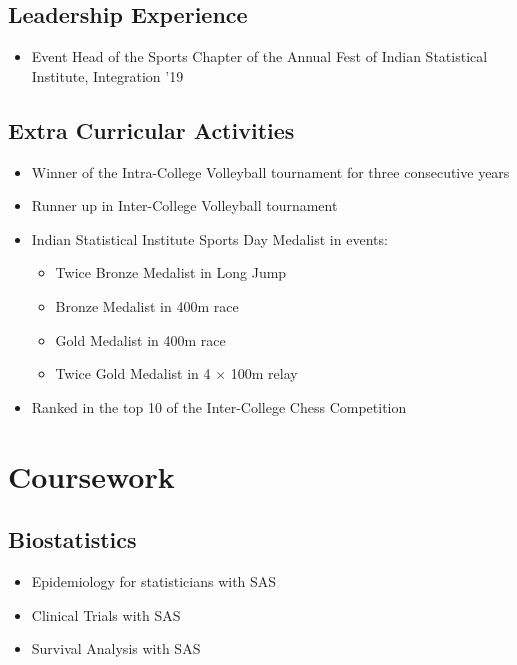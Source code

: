 \documentclass[11pt,a4paper]{article}
\begin{document}
\subsection{Leadership Experience}
\begin{itemize}[leftmargin=*]
  \item Event Head of the Sports Chapter of the Annual Fest of Indian Statistical Institute, Integration '19
\end{itemize}

\subsection{Extra Curricular Activities}
\begin{itemize}[leftmargin=*]
  \item Winner of the Intra-College Volleyball tournament for three consecutive years
  \item Runner up in Inter-College Volleyball tournament
  \item Indian Statistical Institute Sports Day Medalist in events:
    \begin{itemize}
      \item Twice Bronze Medalist in Long Jump
      \item Bronze Medalist in 400m race
      \item Gold Medalist in 400m race
      \item Twice Gold Medalist in 4 × 100m relay
    \end{itemize}
  \item Ranked in the top 10 of the Inter-College Chess Competition
\end{itemize}

\section{Coursework}

\subsection{Biostatistics}
\begin{itemize}[leftmargin=*,noitemsep,topsep=0pt]
  \item Epidemiology for statisticians with SAS
  \item Clinical Trials with SAS
  \item Survival Analysis with SAS
\end{itemize}
\end{document}
